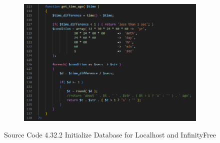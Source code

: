 \begin{enumerate}[1.]
\begin{figure}[h]
\begin{subfigure}[b]{0.8\textwidth}
            \label{fig:sub3}
        \end{subfigure}
        \hspace{0.04\textwidth}
        \begin{subfigure}[b]{0.8\textwidth}
            \centering
            \includegraphics[width=\textwidth]{mainmatter/images/backend/alunandb4.png}
            \label{fig:sub4}
        \end{subfigure}
        \caption*{Source Code 4.32.2 Initialize Database for Localhost and InfinityFree}
        \label{fig:myfig71b}
    \end{figure}

    \clearpage


\end{enumerate}
